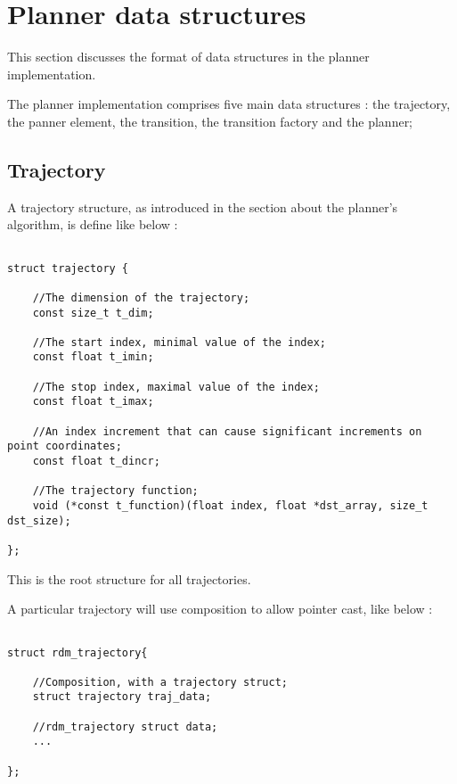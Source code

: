 \newpage

\section{Planner data structures}

This section discusses the format of data structures in the planner implementation.
\newline

The planner implementation comprises five main data structures :
the trajectory, the panner element, the transition, the transition factory and the planner;

\subsection{Trajectory}

A trajectory structure, as introduced in the section about the planner's algorithm, is 
define like below :

\begin{lstlisting}[style=CStyle]

struct trajectory {
	
	//The dimension of the trajectory;
	const size_t t_dim;
	
	//The start index, minimal value of the index;
	const float t_imin;
	
	//The stop index, maximal value of the index;
	const float t_imax;
	
	//An index increment that can cause significant increments on point coordinates;
	const float t_dincr;
	
	//The trajectory function;
	void (*const t_function)(float index, float *dst_array, size_t dst_size);
	
};

\end{lstlisting}

This is the root structure for all trajectories.
\newline

A particular trajectory will use composition to allow pointer cast, like below : 

\begin{lstlisting}[style=CStyle]

struct rdm_trajectory{

	//Composition, with a trajectory struct;
	struct trajectory traj_data;
	
	//rdm_trajectory struct data;
	...	

};

\end{lstlisting}


